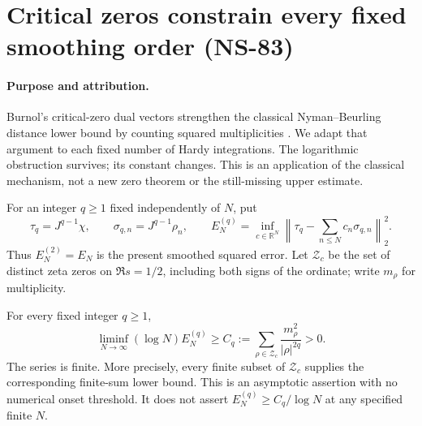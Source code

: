 \section{Critical zeros constrain every fixed smoothing order (NS-83)}
\label{sec:ns83-critical-budget}

\paragraph{Purpose and attribution.}
Burnol's critical-zero dual vectors strengthen the classical
Nyman--Beurling distance lower bound by counting squared multiplicities
\cite[Sections 3--5]{BurnolLower2002}. We adapt that argument to each
fixed number of Hardy integrations. The logarithmic obstruction survives;
its constant changes. This is an application of the classical mechanism,
not a new zero theorem or the still-missing upper estimate.

For an integer $q\geq1$ fixed independently of $N$, put
\[
 \tau_q=J^{q-1}\chi,\qquad \sigma_{q,n}=J^{q-1}\rho_n,
 \qquad E_N^{(q)}=\inf_{c\in\mathbb R^N}
 \left\|\tau_q-\sum_{n\leq N}c_n\sigma_{q,n}\right\|_2^2.
\]
Thus $E_N^{(2)}=E_N$ is the present smoothed squared error.
Let $\mathcal Z_c$ be the set of distinct zeta zeros on $\Re s=1/2$,
including both signs of the ordinate; write $m_\rho$ for multiplicity.

\begin{proposition}
\label{prop:ns83-log-floor}
For every fixed integer $q\geq1$,
\begin{equation}
 \liminf_{N\to\infty}(\log N)E_N^{(q)}
 \geq C_q:=\sum_{\rho\in\mathcal Z_c}
                  \frac{m_\rho^2}{|\rho|^{2q}}>0.
 \label{eq:ns83-log-floor}
\end{equation}
The series is finite. More precisely, every finite subset of
$\mathcal Z_c$ supplies the corresponding finite-sum lower bound.
This is an asymptotic assertion with no numerical onset threshold.
It does not assert $E_N^{(q)}\geq C_q/\log N$ at any specified finite $N$.
\end{proposition}

